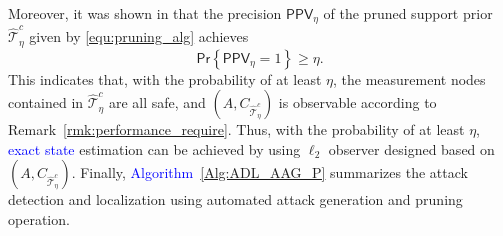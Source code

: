 \noindent Moreover, it was shown in \cite{zheng2021Resilient} that the precision $\textsf{PPV}_{\eta}$ of the pruned support prior $\hat{\mathcal{T}}^c_{\eta}$ given by \eqref{equ:pruning_alg} achieves
\begin{equation}\label{equ:precision_after_pruning}
    \textsf{Pr}\left\{\textsf{PPV}_{\eta} =1 \right\} \geq \eta.
\end{equation} 
This indicates that, with the probability of at least $\eta$, the measurement nodes contained in $\hat{\mathcal{T}}^c_{\eta}$ are all safe, and $(A,C_{\hat{\mathcal{T}}^c_{\eta}})$ is observable according to Remark~\ref{rmk:performance_require}. Thus, with the probability of at least $\eta$, \textcolor{blue}{exact state} estimation can be achieved by using $\ell_2$ observer designed based on $(A,C_{\hat{\mathcal{T}}^c_{\eta}})$.
Finally, \textcolor{blue}{Algorithm~\ref{Alg:ADL_AAG_P}} summarizes the attack detection and localization using automated attack generation and pruning operation.
